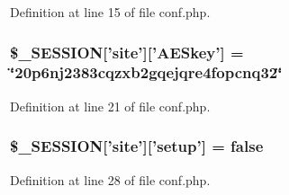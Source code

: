 \-Definition at line 15 of file conf.\-php.

\hypertarget{sites_2default_2conf_8php_acdbd078321573ede00f1ba490a914deb}{
\subsubsection[{\$\-\_\-\-S\-E\-S\-S\-I\-O\-N}]{\setlength{\rightskip}{0pt plus 5cm}\$\-\_\-\-S\-E\-S\-S\-I\-O\-N\mbox{[}'site'\mbox{]}\mbox{[}'\-A\-E\-Skey'\mbox{]} = \char`\"{}20p6nj2383cqzxb2gqejqre4fopcnq32\char`\"{}}}\label{sites_2default_2conf_8php_acdbd078321573ede00f1ba490a914deb}


\-Definition at line 21 of file conf.\-php.

\hypertarget{sites_2default_2conf_8php_aecebd34109af039a13c90ba0f51db8fc}{
\subsubsection[{\$\-\_\-\-S\-E\-S\-S\-I\-O\-N}]{\setlength{\rightskip}{0pt plus 5cm}\$\-\_\-\-S\-E\-S\-S\-I\-O\-N\mbox{[}'site'\mbox{]}\mbox{[}'setup'\mbox{]} = false}}\label{sites_2default_2conf_8php_aecebd34109af039a13c90ba0f51db8fc}


\-Definition at line 28 of file conf.\-php.

